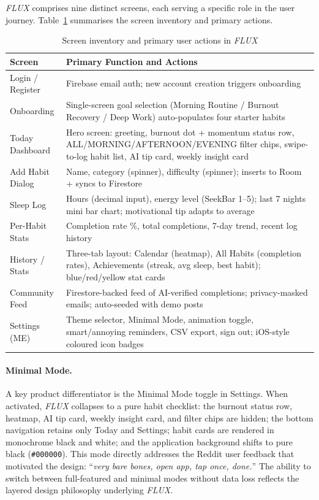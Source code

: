 \documentclass[12pt,a4paper]{article}
\newcommand{\FL}{\textit{FLUX}}
\begin{document}
\FL{} comprises nine distinct screens, each serving a specific role in the user
journey. Table~\ref{tab:screens} summarises the screen inventory and primary actions.

\begin{table}[H]
\centering
\caption{Screen inventory and primary user actions in \FL{}}
\label{tab:screens}
\renewcommand{\arraystretch}{1.3}
\begin{tabularx}{\textwidth}{p{3cm} X}
\toprule
\textbf{Screen} & \textbf{Primary Function and Actions} \\
\midrule
Login / Register & Firebase email auth; new account creation triggers onboarding \\
Onboarding       & Single-screen goal selection (Morning Routine / Burnout Recovery / Deep Work) auto-populates four starter habits \\
Today Dashboard  & Hero screen: greeting, burnout dot + momentum status row, ALL/MORNING/AFTERNOON/EVENING filter chips, swipe-to-log habit list, AI tip card, weekly insight card \\
Add Habit Dialog & Name, category (spinner), difficulty (spinner); inserts to Room + syncs to Firestore \\
Sleep Log        & Hours (decimal input), energy level (SeekBar 1--5); last 7 nights mini bar chart; motivational tip adapts to average \\
Per-Habit Stats  & Completion rate \%, total completions, 7-day trend, recent log history \\
History / Stats  & Three-tab layout: Calendar (heatmap), All Habits (completion rates), Achievements (streak, avg sleep, best habit); blue/red/yellow stat cards \\
Community Feed   & Firestore-backed feed of AI-verified completions; privacy-masked emails; auto-seeded with demo posts \\
Settings (ME)    & Theme selector, Minimal Mode, animation toggle, smart/annoying reminders, CSV export, sign out; iOS-style coloured icon badges \\
\bottomrule
\end{tabularx}
\end{table}

\paragraph{Minimal Mode.}
A key product differentiator is the Minimal Mode toggle in Settings. When activated,
\FL{} collapses to a pure habit checklist: the burnout status row, heatmap, AI tip
card, weekly insight card, and filter chips are hidden; the bottom navigation
retains only Today and Settings; habit cards are rendered in monochrome black and
white; and the application background shifts to pure black (\texttt{\#000000}).
This mode directly addresses the Reddit user feedback that motivated the design:
``\textit{very bare bones, open app, tap once, done.}'' The ability to switch
between full-featured and minimal modes without data loss reflects the layered
design philosophy underlying \FL{}.
\end{document}
